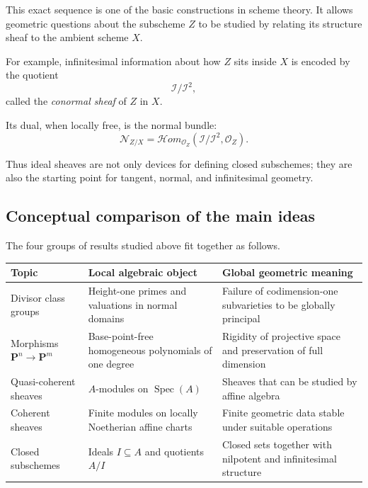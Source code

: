 This exact sequence is one of the basic constructions in scheme theory. It allows geometric questions about the subscheme \(Z\) to be studied by relating its structure sheaf to the ambient scheme \(X\).

For example, infinitesimal information about how \(Z\) sits inside \(X\) is encoded by the quotient
\[
\mathcal{I}/\mathcal{I}^2,
\]
called the \emph{conormal sheaf} of \(Z\) in \(X\).

Its dual, when locally free, is the normal bundle:
\[
\mathcal{N}_{Z/X}
=
\mathcal{H}om_{\mathcal{O}_Z}
\left(
\mathcal{I}/\mathcal{I}^2,
\mathcal{O}_Z
\right).
\]

Thus ideal sheaves are not only devices for defining closed subschemes; they are also the starting point for tangent, normal, and infinitesimal geometry.

\subsection{Conceptual comparison of the main ideas}

The four groups of results studied above fit together as follows.

\begin{center}
	\renewcommand{\arraystretch}{1.25}
	\begin{tabular}{
			>{\raggedright\arraybackslash}p{3.7cm}
			>{\raggedright\arraybackslash}p{5.1cm}
			>{\raggedright\arraybackslash}p{5.1cm}
		}
		\toprule
		\textbf{Topic}
		&
		\textbf{Local algebraic object}
		&
		\textbf{Global geometric meaning}
		\\
		\midrule
		
		Divisor class groups
		&
		Height-one primes and valuations in normal domains
		&
		Failure of codimension-one subvarieties to be globally principal
		\\[4pt]
		
		Morphisms \(\mathbf{P}^n\to\mathbf{P}^m\)
		&
		Base-point-free homogeneous polynomials of one degree
		&
		Rigidity of projective space and preservation of full dimension
		\\[4pt]
		
		Quasi-coherent sheaves
		&
		\(A\)-modules on \(\operatorname{Spec}(A)\)
		&
		Sheaves that can be studied by affine algebra
		\\[4pt]
		
		Coherent sheaves
		&
		Finite modules on locally Noetherian affine charts
		&
		Finite geometric data stable under suitable operations
		\\[4pt]
		
		Closed subschemes
		&
		Ideals \(I\subseteq A\) and quotients \(A/I\)
		&
		Closed sets together with nilpotent and infinitesimal structure
		\\
		\bottomrule
	\end{tabular}
\end{center}

